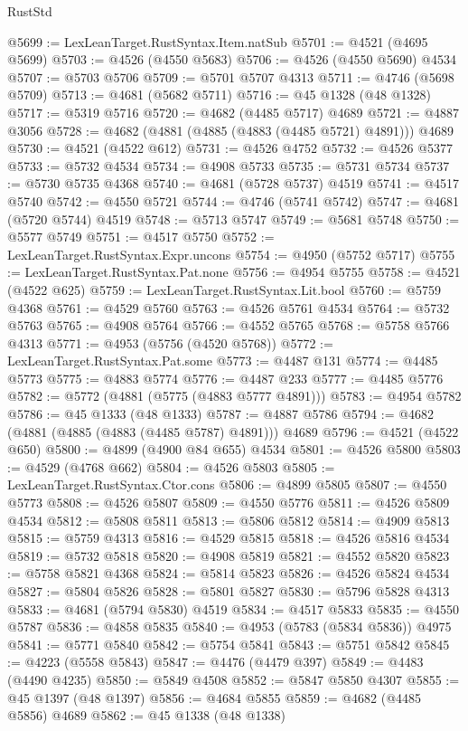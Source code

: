 \begin{lexlean}{RustStd}
\begin{coremodule}
@5699 := LexLeanTarget.RustSyntax.Item.natSub
@5701 := @4521 (@4695 @5699)
@5703 := @4526 (@4550 @5683)
@5706 := @4526 (@4550 @5690) @4534
@5707 := @5703 @5706
@5709 := @5701 @5707 @4313
@5711 := @4746 (@5698 @5709)
@5713 := @4681 (@5682 @5711)
@5716 := @45 @1328 (@48 @1328)
@5717 := @5319 @5716
@5720 := @4682 (@4485 @5717) @4689
@5721 := @4887 @3056
@5728 := @4682 (@4881 (@4885 (@4883 (@4485 @5721) @4891))) @4689
@5730 := @4521 (@4522 @612)
@5731 := @4526 @4752
@5732 := @4526 @5377
@5733 := @5732 @4534
@5734 := @4908 @5733
@5735 := @5731 @5734
@5737 := @5730 @5735 @4368
@5740 := @4681 (@5728 @5737) @4519
@5741 := @4517 @5740
@5742 := @4550 @5721
@5744 := @4746 (@5741 @5742)
@5747 := @4681 (@5720 @5744) @4519
@5748 := @5713 @5747
@5749 := @5681 @5748
@5750 := @5577 @5749
@5751 := @4517 @5750
@5752 := LexLeanTarget.RustSyntax.Expr.uncons
@5754 := @4950 (@5752 @5717)
@5755 := LexLeanTarget.RustSyntax.Pat.none
@5756 := @4954 @5755
@5758 := @4521 (@4522 @625)
@5759 := LexLeanTarget.RustSyntax.Lit.bool
@5760 := @5759 @4368
@5761 := @4529 @5760
@5763 := @4526 @5761 @4534
@5764 := @5732 @5763
@5765 := @4908 @5764
@5766 := @4552 @5765
@5768 := @5758 @5766 @4313
@5771 := @4953 (@5756 (@4520 @5768))
@5772 := LexLeanTarget.RustSyntax.Pat.some
@5773 := @4487 @131
@5774 := @4485 @5773
@5775 := @4883 @5774
@5776 := @4487 @233
@5777 := @4485 @5776
@5782 := @5772 (@4881 (@5775 (@4883 @5777 @4891)))
@5783 := @4954 @5782
@5786 := @45 @1333 (@48 @1333)
@5787 := @4887 @5786
@5794 := @4682 (@4881 (@4885 (@4883 (@4485 @5787) @4891))) @4689
@5796 := @4521 (@4522 @650)
@5800 := @4899 (@4900 @84 @655) @4534
@5801 := @4526 @5800
@5803 := @4529 (@4768 @662)
@5804 := @4526 @5803
@5805 := LexLeanTarget.RustSyntax.Ctor.cons
@5806 := @4899 @5805
@5807 := @4550 @5773
@5808 := @4526 @5807
@5809 := @4550 @5776
@5811 := @4526 @5809 @4534
@5812 := @5808 @5811
@5813 := @5806 @5812
@5814 := @4909 @5813
@5815 := @5759 @4313
@5816 := @4529 @5815
@5818 := @4526 @5816 @4534
@5819 := @5732 @5818
@5820 := @4908 @5819
@5821 := @4552 @5820
@5823 := @5758 @5821 @4368
@5824 := @5814 @5823
@5826 := @4526 @5824 @4534
@5827 := @5804 @5826
@5828 := @5801 @5827
@5830 := @5796 @5828 @4313
@5833 := @4681 (@5794 @5830) @4519
@5834 := @4517 @5833
@5835 := @4550 @5787
@5836 := @4858 @5835
@5840 := @4953 (@5783 (@5834 @5836)) @4975
@5841 := @5771 @5840
@5842 := @5754 @5841
@5843 := @5751 @5842
@5845 := @4223 (@5558 @5843)
@5847 := @4476 (@4479 @397)
@5849 := @4483 (@4490 @4235)
@5850 := @5849 @4508
@5852 := @5847 @5850 @4307
@5855 := @45 @1397 (@48 @1397)
@5856 := @4684 @5855
@5859 := @4682 (@4485 @5856) @4689
@5862 := @45 @1338 (@48 @1338)

\end{coremodule}
\end{lexlean}

